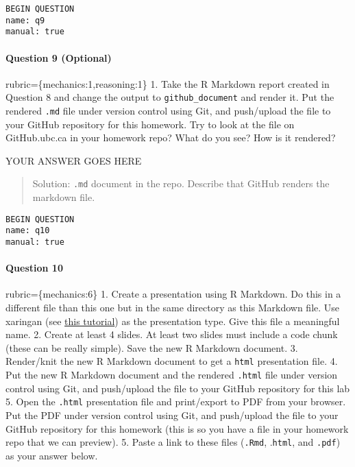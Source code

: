 \documentclass[
]{article}
\begin{document}
\begin{verbatim}
BEGIN QUESTION
name: q9
manual: true
\end{verbatim}

\begin{alert alert-info}
\hypertarget{question-9-optional}{%
\paragraph{Question 9 (Optional)}\label{question-9-optional}}

rubric=\{mechanics:1,reasoning:1\} 1. Take the R Markdown report created
in Question 8 and change the output to \texttt{github\_document} and
render it. Put the rendered \texttt{.md} file under version control
using Git, and push/upload the file to your GitHub repository for this
homework. Try to look at the file on GitHub.ubc.ca in your homework
repo? What do you see? How is it rendered?
\end{alert alert-info}

YOUR ANSWER GOES HERE

\begin{quote}
Solution: \texttt{.md} document in the repo. Describe that GitHub
renders the markdown file.
\end{quote}

\begin{verbatim}
BEGIN QUESTION
name: q10
manual: true
\end{verbatim}

\begin{alert alert-info}
\hypertarget{question-10}{%
\paragraph{Question 10}\label{question-10}}

rubric=\{mechanics:6\} 1. Create a presentation using R Markdown. Do
this in a different file than this one but in the same directory as this
Markdown file. Use xaringan (see
\href{https://bookdown.org/yihui/rmarkdown/xaringan.html}{this
tutorial}) as the presentation type. Give this file a meaningful name.
2. Create at least 4 slides. At least two slides must include a code
chunk (these can be really simple). Save the new R Markdown document. 3.
Render/knit the new R Markdown document to get a \texttt{html}
presentation file. 4. Put the new R Markdown document and the rendered
\texttt{.html} file under version control using Git, and push/upload the
file to your GitHub repository for this lab 5. Open the \texttt{.html}
presentation file and print/export to PDF from your browser. Put the PDF
under version control using Git, and push/upload the file to your GitHub
repository for this homework (this is so you have a file in your
homework repo that we can preview). 5. Paste a link to these files
(\texttt{.Rmd}, .\texttt{html}, and \texttt{.pdf}) as your answer below.
\end{alert alert-info}
\end{document}
